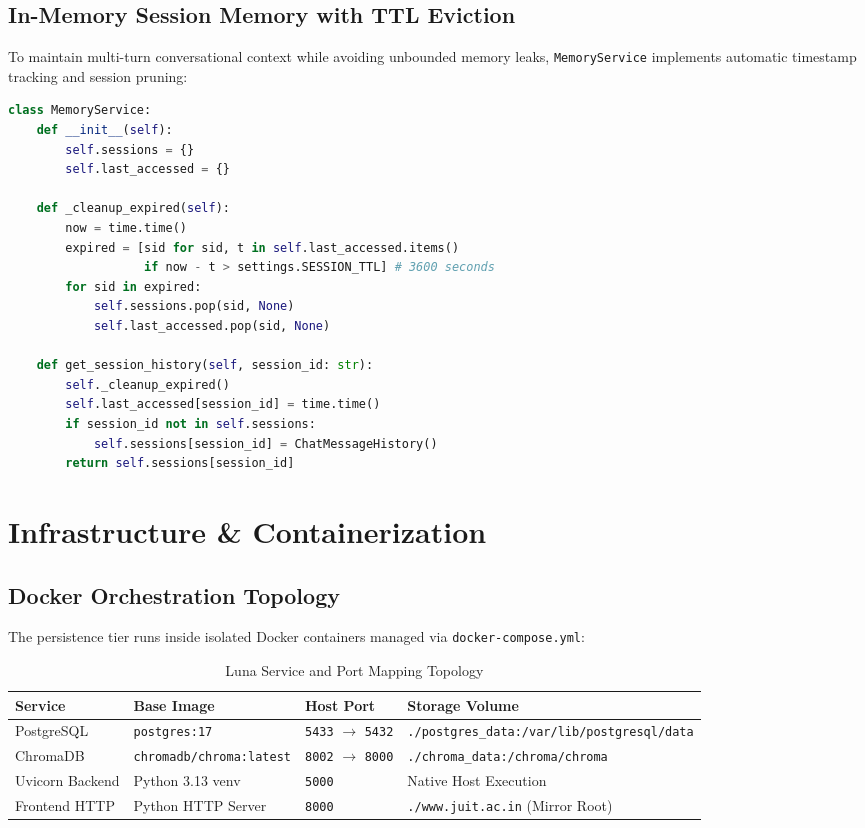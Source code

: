 \documentclass[11pt,a4paper]{article}
\begin{document}
\subsection{In-Memory Session Memory with TTL Eviction}
To maintain multi-turn conversational context while avoiding unbounded memory leaks, \texttt{MemoryService} implements automatic timestamp tracking and session pruning:
\begin{lstlisting}[language=Python, caption={Session Memory Management with TTL Pruning}]
class MemoryService:
    def __init__(self):
        self.sessions = {}
        self.last_accessed = {}

    def _cleanup_expired(self):
        now = time.time()
        expired = [sid for sid, t in self.last_accessed.items() 
                   if now - t > settings.SESSION_TTL] # 3600 seconds
        for sid in expired:
            self.sessions.pop(sid, None)
            self.last_accessed.pop(sid, None)

    def get_session_history(self, session_id: str):
        self._cleanup_expired()
        self.last_accessed[session_id] = time.time()
        if session_id not in self.sessions:
            self.sessions[session_id] = ChatMessageHistory()
        return self.sessions[session_id]
\end{lstlisting}

\section{Infrastructure \& Containerization}

\subsection{Docker Orchestration Topology}
The persistence tier runs inside isolated Docker containers managed via \texttt{docker-compose.yml}:
\begin{table}[H]
    \centering
    \small
    \begin{tabular}{@{}llll@{}}
        \toprule
        \textbf{Service} & \textbf{Base Image} & \textbf{Host Port} & \textbf{Storage Volume} \\ \midrule
        PostgreSQL & \texttt{postgres:17} & \texttt{5433} $\rightarrow$ \texttt{5432} & \texttt{./postgres\_data:/var/lib/postgresql/data} \\
        ChromaDB & \texttt{chromadb/chroma:latest} & \texttt{8002} $\rightarrow$ \texttt{8000} & \texttt{./chroma\_data:/chroma/chroma} \\
        Uvicorn Backend & Python 3.13 venv & \texttt{5000} & Native Host Execution \\
        Frontend HTTP & Python HTTP Server & \texttt{8000} & \texttt{./www.juit.ac.in} (Mirror Root) \\ \bottomrule
    \end{tabular}
    \caption{Luna Service and Port Mapping Topology}
    \label{tab:ports}
\end{table}
\end{document}
